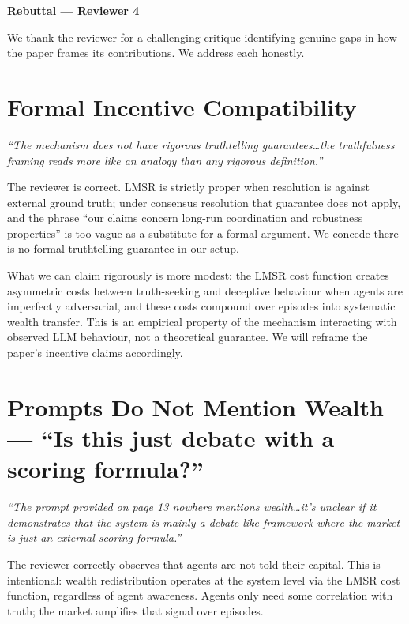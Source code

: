 \documentclass[10pt]{article}
\begin{document}
\begin{center}
  {\large\bfseries Rebuttal --- Reviewer 4}
\end{center}

We thank the reviewer for a challenging critique identifying genuine gaps in
how the paper frames its contributions. We address each honestly.

\section*{Formal Incentive Compatibility}

\textit{``The mechanism does not have rigorous truthtelling guarantees\ldots the
truthfulness framing reads more like an analogy than any rigorous definition.''}

The reviewer is correct. LMSR is strictly proper when resolution is against
external ground truth; under consensus resolution that guarantee does not apply,
and the phrase ``our claims concern long-run coordination and robustness
properties'' is too vague as a substitute for a formal argument. We concede
there is no formal truthtelling guarantee in our setup.

What we can claim rigorously is more modest: the LMSR cost function creates
asymmetric costs between truth-seeking and deceptive behaviour when agents are
imperfectly adversarial, and these costs compound over episodes into systematic
wealth transfer. This is an empirical property of the mechanism interacting with
observed LLM behaviour, not a theoretical guarantee. We will reframe the paper's
incentive claims accordingly.

\section*{Prompts Do Not Mention Wealth ---
``Is this just debate with a scoring formula?''}

\textit{``The prompt provided on page 13 nowhere mentions wealth\ldots it's
unclear if it demonstrates that the system is mainly a debate-like framework
where the market is just an external scoring formula.''}

The reviewer correctly observes that agents are not told their capital. This
is intentional: wealth redistribution operates at the system level via the LMSR
cost function, regardless of agent awareness. Agents only need some correlation
with truth; the market amplifies that signal over episodes.
\end{document}
